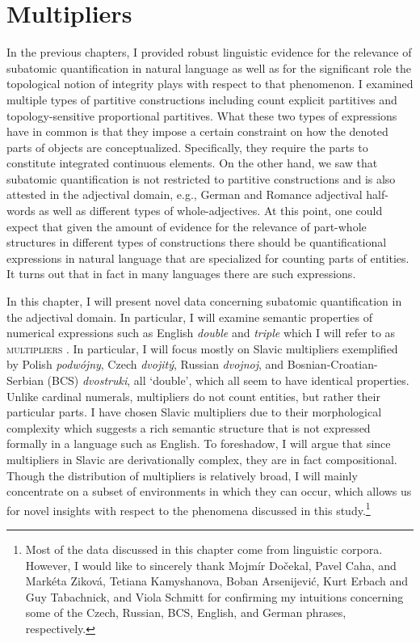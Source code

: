 \chapter{Multipliers}\label{ch:multipliers}

In the previous chapters, I provided robust linguistic evidence for the relevance of subatomic quantification in natural language as well as for the significant role the topological notion of integrity plays with respect to that phenomenon. I examined multiple types of partitive constructions including count explicit partitives and topology-sensitive proportional partitives. What these two types of expressions have in common is that they impose a certain constraint on how the denoted parts of objects are conceptualized. Specifically, they require the parts to constitute integrated continuous elements. On the other hand, we saw that subatomic quantification is not restricted to partitive constructions and is also attested in the adjectival domain, e.g., German and Romance adjectival half-words as well as different types of whole-adjectives. At this point, one could expect that given the amount of evidence for the relevance of part-whole structures in different types of constructions there should be quantificational expressions in natural language that are specialized for counting parts of entities. It turns out that in fact in many languages there are such expressions.\largerpage[3]  

In this chapter, I will present novel data concerning subatomic quantification in the adjectival domain. In particular, I will examine semantic properties of numerical expressions such as English \textit{double} and \textit{triple} which I will refer to as \textsc{multipliers} \citep[following][]{quirk_greenbaum_leech_svartvik1985comprehensive,huddleston_pullum2002cambridge}. In particular, I will focus mostly on Slavic multipliers exemplified by Polish \textit{podwójny}, Czech \textit{dvojitý}, Russian \textit{dvojnoj}, and Bosnian-Croatian-Serbian (BCS) \textit{dvostruki}, all `double', which all seem to have identical properties. Unlike cardinal numerals, multipliers do not count entities, but rather their particular parts. I have chosen Slavic multipliers due to their morphological complexity which suggests a rich semantic structure that is not expressed formally in a language such as English. To foreshadow, I will argue that since multipliers in Slavic are derivationally complex, they are in fact compositional. Though the distribution of multipliers is relatively broad, I will mainly concentrate on a subset of environments in which they can occur, which allows us for novel insights with respect to the phenomena discussed in this study.\footnote{Most of the data discussed in this chapter come from linguistic corpora. However, I would like to sincerely thank Mojmír Dočekal, Pavel Caha, and Markéta Ziková, Tetiana Kamyshanova, Boban Arsenijević, Kurt Erbach and Guy Tabachnick, and Viola Schmitt for confirming my intuitions concerning some of the Czech, Russian, BCS, English, and German phrases, respectively.}

